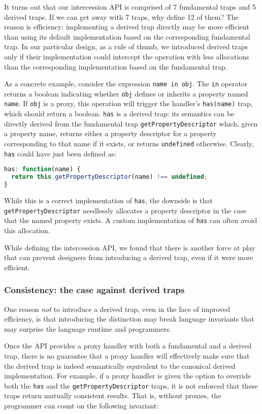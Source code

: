 \documentclass{acm_proc_article-sp}
\begin{document}
It turns out that our intercession API is comprised of 7 fundamental traps and 5 derived traps. If we can get away with 7 traps, why define 12 of them? The reason is efficiency: implementing a derived trap directly may be more efficient than using its default implementation based on the corresponding fundamental trap. In our particular design, as a rule of thumb, we introduced derived traps only if their implementation could intercept the operation with less allocations than the corresponding implementation based on the fundamental trap.

As a concrete example, consider the expression \texttt{name in obj}. The \texttt{in} operator returns a boolean indicating whether \texttt{obj} defines or inherits a property named \texttt{name}. If \texttt{obj} is a proxy, this operation will trigger the handler's \texttt{has(name)} trap, which should return a boolean. \texttt{has} is a derived trap: its semantics can be directly derived from the fundamental trap \texttt{getPropertyDescriptor} which, given a property name, returns either a property descriptor for a property corresponding to that name if it exists, or returns \texttt{undefined} otherwise. Clearly, \texttt{has} could have just been defined as:

\begin{lstlisting}[language=javascript]
has: function(name) {
  return this.getPropertyDescriptor(name) !== undefined;
}
\end{lstlisting}

While this is a correct implementation of \texttt{has}, the downside is that \texttt{getPropertyDescriptor} needlessly allocates a property descriptor in the case that the named property exists. A custom implementation of \texttt{has} can often avoid this allocation.

While defining the intercession API, we found that there is another force at play that can prevent designers from introducing a derived trap, even if it were more efficient.

\subsubsection{Consistency: the case against derived traps}

One reason \emph{not} to introduce a derived trap, even in the face of improved efficiency, is that introducing the distinction may break language invariants that may surprise the language runtime and programmers.

Once the API provides a proxy handler with both a fundamental and a derived trap, there is no guarantee that a proxy handler will effectively make sure that the derived trap is indeed semantically equivalent to the canonical derived implementation. For example, if a proxy handler is given the option to override both the \texttt{has} and the \texttt{getPropertyDescriptor} traps, it is not enforced that these traps return mutually consistent results. That is, without proxies, the programmer can count on the following invariant:
\end{document}
